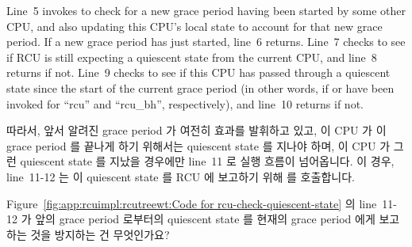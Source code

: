 Line~5 invokes  to check for
a new grace period having been started by some other CPU, and also
updating this CPU's local state to account for that new grace period.
If a new grace period has just started, line~6 returns.
Line~7 checks to see if RCU is still expecting a quiescent state from
the current CPU, and line~8 returns if not.
Line~9 checks to see if this CPU has passed through a quiescent state
since the start of the current grace period (in other words, if
 or  have been invoked
for ``rcu'' and ``rcu\_bh'', respectively), and line~10 returns if not.
\fi

따라서, 앞서 알려진 grace period 가 여전히 효과를 발휘하고 있고, 이 CPU 가 이
grace period 를 끝나게 하기 위해서는 quiescent state 를 지나야 하며, 이 CPU 가
그런 quiescent state 를 지났을 경우에만 line~11 로 실행 흐름이 넘어옵니다.
이 경우, line~11-12 는 이 quiescent state 를 RCU 에 보고하기 위해
 를 호출합니다.
\iffalse

Therefore, execution reaches line~11 only if a previously noted grace
period is still in effect, if this CPU needs to pass through a
quiescent state in order to allow this grace period to end, and
if this CPU has passed through such a quiescent state.
In this case, lines~11-12 invoke \co{cpu_quiet()} in order to report
this quiescent state to RCU.
\fi

\QuickQuiz{}
	Figure~\ref{fig:app:rcuimpl:rcutreewt:Code for rcu-check-quiescent-state}
	의 line~11-12 가 앞의 grace period 로부터의 quiescent state 를 현재의
	grace period 에게 보고하는 것을 방지하는 건 무엇인가요?
	\iffalse

